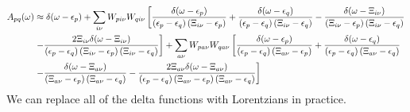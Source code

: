 \begin{align}
    A_{pq}(\omega) &\approx \delta(\omega - \epsilon_p) + \sum_{i\nu} W_{p i \nu} W_{q i \nu} \left[\frac{\delta(\omega - \epsilon_p)}{\left(\epsilon_p-\epsilon_q\right)\left(\Xi_{i\nu}-\epsilon_p\right)} + \frac{\delta(\omega - \epsilon_q)}{\left(\epsilon_p-\epsilon_q\right)\left(\Xi_{i\nu}-\epsilon_q\right)} - \frac{\delta(\omega - \Xi_{i\nu})}{\left(\Xi_{i\nu}-\epsilon_p\right)\left(\Xi_{i\nu}-\epsilon_q\right)} \right. \\
&\left. - \frac{2\Xi_{i\nu}\delta(\omega - \Xi_{i\nu})}{\left(\epsilon_p-\epsilon_q\right)\left(\Xi_{i\nu}-\epsilon_p\right)\left(\Xi_{i\nu}-\epsilon_q\right)}\right] + \sum_{a\nu} W_{p a \nu} W_{q a \nu} \left[\frac{\delta(\omega - \epsilon_p)}{\left(\epsilon_p-\epsilon_q\right)\left({\Xi}_{a\nu}-\epsilon_p\right)} + \frac{\delta(\omega - \epsilon_q)}{\left(\epsilon_p-\epsilon_q\right)\left({\Xi}_{a\nu}-\epsilon_q\right)} \right. \\
& \left.- \frac{\delta(\omega - {\Xi}_{a\nu})}{\left({\Xi}_{a\nu}-\epsilon_p\right)\left({\Xi}_{a\nu}-\epsilon_q\right)}  - \frac{2{\Xi}_{a\nu}\delta(\omega - {\Xi}_{a\nu})}{\left(\epsilon_p-\epsilon_q\right)\left({\Xi}_{a\nu}-\epsilon_p\right)\left({\Xi}_{a\nu}-\epsilon_q\right)}\right] \notag
\end{align}
We can replace all of the delta functions with Lorentzians in practice.
